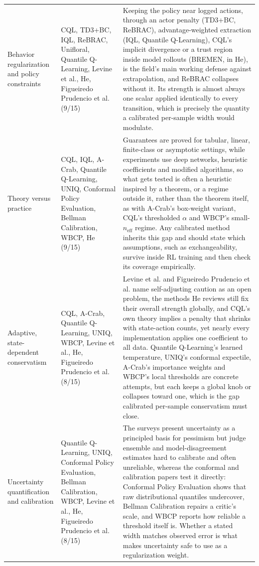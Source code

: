 \documentclass[11pt]{article}
\begin{document}
{\begin{longtable}{P{3.4cm} P{3.6cm} P{8.2cm}}
\addlinespace
Behavior regularization and policy constraints & CQL, TD3+BC, IQL, ReBRAC, Unifloral, Quantile Q-Learning, Levine et al., He, Figueiredo Prudencio et al. (9/15) & Keeping the policy near logged actions, through an actor penalty (TD3+BC, ReBRAC), advantage-weighted extraction (IQL, Quantile Q-Learning), CQL's implicit divergence or a trust region inside model rollouts (BREMEN, in He), is the field's main working defense against extrapolation, and ReBRAC collapses without it. Its strength is almost always one scalar applied identically to every transition, which is precisely the quantity a calibrated per-sample width would modulate. \\
\addlinespace
Theory versus practice & CQL, IQL, A-Crab, Quantile Q-Learning, UNIQ, Conformal Policy Evaluation, Bellman Calibration, WBCP, He (9/15) & Guarantees are proved for tabular, linear, finite-class or asymptotic settings, while experiments use deep networks, heuristic coefficients and modified algorithms, so what gets tested is often a heuristic inspired by a theorem, or a regime outside it, rather than the theorem itself, as with A-Crab's box-weight variant, CQL's thresholded \ensuremath{\alpha} and WBCP's small-$n_{\mathrm{eff}}$ regime. Any calibrated method inherits this gap and should state which assumptions, such as exchangeability, survive inside RL training and then check its coverage empirically. \\
\addlinespace
Adaptive, state-dependent conservatism & CQL, A-Crab, Quantile Q-Learning, UNIQ, WBCP, Levine et al., He, Figueiredo Prudencio et al. (8/15) & Levine et al. and Figueiredo Prudencio et al. name self-adjusting caution as an open problem, the methods He reviews still fix their overall strength globally, and CQL's own theory implies a penalty that shrinks with state-action counts, yet nearly every implementation applies one coefficient to all data. Quantile Q-Learning's learned temperature, UNIQ's conformal expectile, A-Crab's importance weights and WBCP's local thresholds are concrete attempts, but each keeps a global knob or collapses toward one, which is the gap calibrated per-sample conservatism must close. \\
\addlinespace
Uncertainty quantification and calibration & Quantile Q-Learning, UNIQ, Conformal Policy Evaluation, Bellman Calibration, WBCP, Levine et al., He, Figueiredo Prudencio et al. (8/15) & The surveys present uncertainty as a principled basis for pessimism but judge ensemble and model-disagreement estimates hard to calibrate and often unreliable, whereas the conformal and calibration papers test it directly: Conformal Policy Evaluation shows that raw distributional quantiles undercover, Bellman Calibration repairs a critic's scale, and WBCP reports how reliable a threshold itself is. Whether a stated width matches observed error is what makes uncertainty safe to use as a regularization weight. \\

\end{longtable}}
\end{document}
